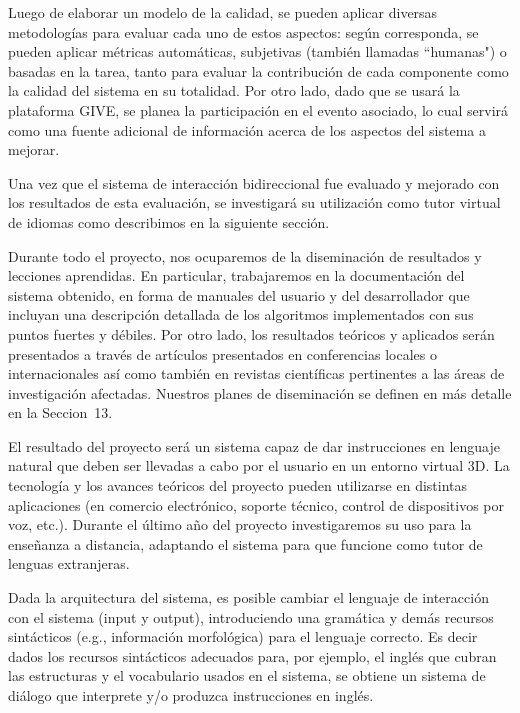 Luego de elaborar un modelo de la calidad, se pueden aplicar diversas
metodolog\'ias para evaluar cada uno de estos aspectos: seg\'un corresponda, se
pueden aplicar m\'etricas autom\'aticas, subjetivas (tambi\'en llamadas
``humanas") o basadas en la tarea, tanto para evaluar la contribuci\'on de cada
componente como la calidad del sistema en su totalidad.
Por otro lado, dado que se usar\'a la plataforma GIVE, se planea la
participaci\'on en el evento asociado, lo cual servir\'a como una fuente
adicional de informaci\'on acerca de los aspectos del sistema a mejorar.

Una vez que el sistema de interacci\'on bidireccional fue evaluado y mejorado
con los resultados de esta evaluaci\'on,  
se investigar\'a su utilizaci\'on 
como tutor virtual de idiomas como describimos en la siguiente secci\'on. 


Durante todo el proyecto, nos ocuparemos de la diseminaci\'on de resultados y
lecciones aprendidas.  En particular, trabajaremos en la documentaci\'on del
sistema obtenido, en forma de manuales del usuario y del desarrollador que
incluyan una descripci\'on detallada de los algoritmos implementados con sus
puntos fuertes y d\'ebiles.
Por otro lado, los resultados te\'oricos y aplicados ser\'an presentados a
trav\'es de art\'iculos presentados en conferencias locales o internacionales
as\'i como tambi\'en en revistas cient\'ificas pertinentes a las \'areas de
investigaci\'on afectadas.  Nuestros
planes de diseminaci\'on se definen en m\'as detalle en la Seccion~13.




El resultado del proyecto ser\'a un sistema capaz de dar instrucciones
en lenguaje natural que deben ser llevadas a cabo por el usuario en un
entorno virtual 3D.  La tecnolog\'ia y los avances te\'oricos del proyecto
pueden utilizarse en distintas aplicaciones (en comercio electr\'onico,
soporte t\'ecnico, control de dispositivos por voz, etc.).  Durante el
\'ultimo a\~no del proyecto investigaremos su uso para la ense\~nanza a
distancia, adaptando el sistema para que funcione como tutor de lenguas
extranjeras.

Dada la arquitectura del sistema, es posible cambiar el lenguaje de
interacci\'on con el sistema (input y output), introduciendo
una gram\'atica y dem\'as recursos sint\'acticos (e.g., informaci\'on
morfol\'ogica) para el lenguaje correcto.  Es decir dados los recursos
sint\'acticos adecuados para, por ejemplo, el ingl\'es que cubran las
estructuras y el vocabulario usados en el sistema, se obtiene un sistema
de di\'alogo que interprete y/o produzca instrucciones en ingl\'es.

